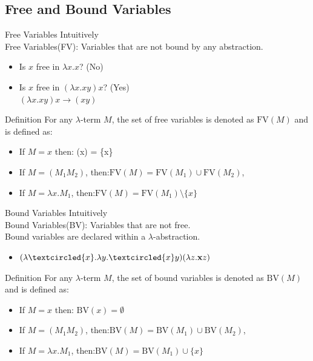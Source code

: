 \documentclass{beamer}
\begin{document}
\subsection{Free and Bound Variables}
\begin{frame}{Free Variables}
  Intuitively\\
  Free Variables(FV): Variables that are not bound by any abstraction.
  \begin{itemize}
    \item Is $x$ free in $\lambda x.x$? (No)
    \item Is $x$ free in $(\lambda x.xy)x$? (Yes)\\
    $(\lambda x.xy)x \to (xy)$
  \end{itemize}
  \begin{block}{Definition}
    For any $\lambda$-term \(M\), the set of free variables is denoted as \(\text{FV}(M)\) and is defined as:
    \begin{itemize}
      \item If \(M = x\) then: (x) = \{x\}
      \item If \(M = (M_1 M_2)\), then:$\text{FV}(M) = \text{FV}(M_1) \cup \text{FV}(M_2)$,
      \item If \(M = \lambda x.M_1\), then:$\text{FV}(M) = \text{FV}(M_1) \setminus \{x\}$
    \end{itemize}

  \end{block}
\end{frame}
\begin{frame}{Bound Variables}
  Intuitively\\
  Bound Variables(BV): Variables that are not free.\\
  Bound variables are declared within a $\lambda$-abstraction.\\
  \begin{itemize}
    \item $(\lambda \textcircled{x}.\lambda y.\textcircled{x}y) (\lambda z.\mathbf{x}z)$
  \end{itemize}
  \begin{block}{Definition}
    For any $\lambda$-term \(M\), the set of bound variables is denoted as \(\text{BV}(M)\) and is defined as:
    \begin{itemize}
      \item If \(M = x\) then: $\text{BV}(x) = \emptyset$
      \item If \(M = (M_1 M_2)\), then:$\text{BV}(M) = \text{BV}(M_1) \cup \text{BV}(M_2)$,
      \item If \(M = \lambda x.M_1\), then:$\text{BV}(M) = \text{BV}(M_1) \cup \{x\}$
    \end{itemize}
  \end{block}
\end{frame}
\end{document}
